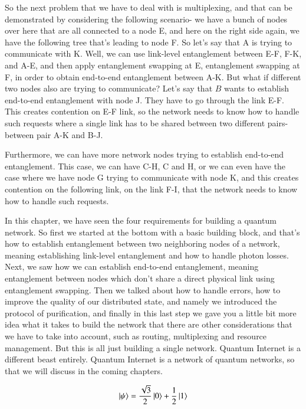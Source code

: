 So the next problem that we have to deal with is multiplexing, and that can be demonstrated by considering the following scenario- we have a bunch of nodes over here that are all connected to a node E, and here on the right side again, we have the following tree that's leading to node F. So let's say that A is trying to communicate with K. Well, we can use link-level entanglement between E-F, F-K, and A-E, and then apply entanglement swapping at E, entanglement swapping at F, in order to obtain end-to-end entanglement between A-K. But what if different two nodes also are trying to communicate? Let's say that $B$ wants to establish end-to-end entanglement with node J. They have to go through the link E-F. This creates contention on E-F link, so the network needs to know how to handle such requests where a single link has to be shared between two different pairs- between pair A-K and B-J.

Furthermore, we can have more network nodes trying to establish end-to-end entanglement. This case, we can have C-H, C and H, or we can even have the case where we have node G trying to communicate with node K, and this creates contention on the following link, on the link F-I, that the network needs to know how to handle such requests.

In this chapter, we have seen the four requirements for building a quantum network. So first we started at the bottom with a basic building block, and that's how to establish entanglement between two neighboring nodes of a network, meaning establishing link-level entanglement and how to handle photon losses. Next, we saw how we can establish end-to-end entanglement, meaning entanglement between nodes which don't share a direct physical link using entanglement swapping. Then we talked about how to handle errors, how to improve the quality of our distributed state, and namely we introduced the protocol of purification, and finally in this last step we gave you a little bit more idea what it takes to build the network that there are other considerations that we have to take into account, such as routing, multiplexing and resource management. But this is all just building a single network. Quantum Internet is a different beast entirely. Quantum Internet is a network of quantum networks, so that we will discuss in the coming chapters.


\newpage
\begin{exercises}
\begin{equation*}
\left| \psi \right\rangle = \frac{\sqrt{3}}{2}\left| 0 \right\rangle + \frac{1}{2}\left| 1 \right\rangle
\end{equation*}


\end{exercises}

